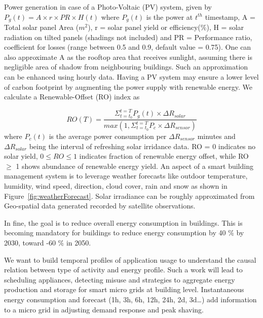 Power generation in case of a Photo-Voltaic (PV) system, given by $ P_g(t) = A \times r  \times PR \times H(t) $ where $P_g(t)$ is the power at $t^{th}$ timestamp, A = Total solar panel Area ($m^2$), r = solar panel yield or efficiency($\%$), H = solar radiation on tilted panels (shadings not included) and PR = Performance ratio, coefficient for losses (range between 0.5 and 0.9, default value = 0.75). One can also approximate A as the rooftop area that receives sunlight, assuming there is negligible area of shadow from neighbouring buildings. Such an approximation can be enhanced using hourly data. Having a PV system may ensure a lower level of carbon footprint by augmenting the power supply with renewable energy. 
We calculate a Renewable-Offset (RO) index as 

\begin{equation}
    RO(T) = \frac{ \Sigma_{t=t_0}^{t=T} P_g(t) \times \Delta R_{solar} }{max(1,\Sigma_{t=t_0}^{t=T} P_c \times \Delta R_{sensor}) }
\end{equation} 
where $P_c(t)$ is the average power consumption per $\Delta R_{sensor}$ minutes and $\Delta R_{solar}$ being the interval of refreshing solar irridance data.  RO = 0 indicates no solar yield, $0 \leq RO \leq 1$ indicates fraction of renewable energy offset, while RO $\geq$ 1 shows abundance of renewable energy yield. An aspect of a smart building management system is to leverage weather forecasts like outdoor temperature, humidity, wind speed, direction, cloud cover, rain and snow as shown in Figure~\ref{fig:weatherForecast}. Solar irradiance can be roughly approximated from Geo-spatial data generated recorded by satellite observations.









In fine, the goal is to reduce overall energy consumption in buildings. This is becoming mandatory for buildings to reduce energy consumption by 40 $\%$ by 2030, toward -60 $\%$ in 2050. 

We want to build temporal profiles of application usage to understand the causal relation between type of activity and energy profile. Such a work will lead to scheduling appliances, detecting misuse and strategies to aggregate energy production and storage for smart micro grids at building level.  Instantaneous energy consumption and forecast (1h, 3h, 6h, 12h, 24h, 2d, 3d…) add information to a micro grid in adjusting demand response and peak shaving. 

